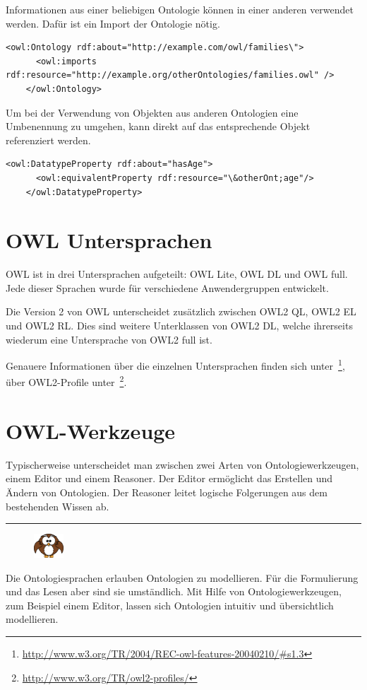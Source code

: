 Informationen aus einer beliebigen Ontologie können in einer anderen verwendet werden. Dafür ist ein Import der Ontologie nötig.

\begin{lstlisting}[caption={Beispiel eines Importes einer Ontologie}]
    <owl:Ontology rdf:about="http://example.com/owl/families\">
      <owl:imports rdf:resource="http://example.org/otherOntologies/families.owl" />
    </owl:Ontology>
\end{lstlisting}


Um bei der Verwendung von Objekten aus anderen Ontologien eine Umbenennung zu umgehen, kann direkt auf das entsprechende Objekt referenziert werden.

\begin{lstlisting}[caption={Beispiel einer Referenzierung auf ein Objekt einer externen Ontologie}]
    <owl:DatatypeProperty rdf:about="hasAge">
      <owl:equivalentProperty rdf:resource="\&otherOnt;age"/>
    </owl:DatatypeProperty>
\end{lstlisting}

\section{OWL Untersprachen}
\label{sec:owl_owl_Untersprachen}
OWL ist in drei Untersprachen aufgeteilt: OWL Lite, OWL DL und OWL full. Jede dieser Sprachen wurde für verschiedene Anwendergruppen entwickelt.

Die Version 2 von OWL unterscheidet zusätzlich zwischen OWL2 QL, OWL2 EL und OWL2 RL. Dies sind weitere Unterklassen von OWL2 DL, welche ihrerseits wiederum eine Untersprache von OWL2 full ist.

Genauere Informationen über die einzelnen Untersprachen finden sich unter~\footnote{\url{http://www.w3.org/TR/2004/REC-owl-features-20040210/\#s1.3}}, über OWL2-Profile unter~\footnote{\url{http://www.w3.org/TR/owl2-profiles/}}.

\section{OWL-Werkzeuge}
\label{sec:owl_owl_OwlTools}
Typischerweise unterscheidet man zwischen zwei Arten von Ontologiewerkzeugen, einem Editor und einem Reasoner. Der Editor ermöglicht das Erstellen und Ändern von Ontologien. Der Reasoner leitet logische Folgerungen aus dem bestehenden Wissen ab.

\noindent\rule[1ex]{\textwidth}{1pt}
\begin{figure}
    \vspace{-19pt}
    \includegraphics[width=0.1\textwidth]{bilder/owl.png}
\end{figure}
Die Ontologiesprachen erlauben Ontologien zu modellieren. Für die Formulierung und das Lesen aber sind sie umständlich. Mit Hilfe von Ontologiewerkzeugen, zum Beispiel einem Editor, lassen sich Ontologien intuitiv und übersichtlich modellieren.

